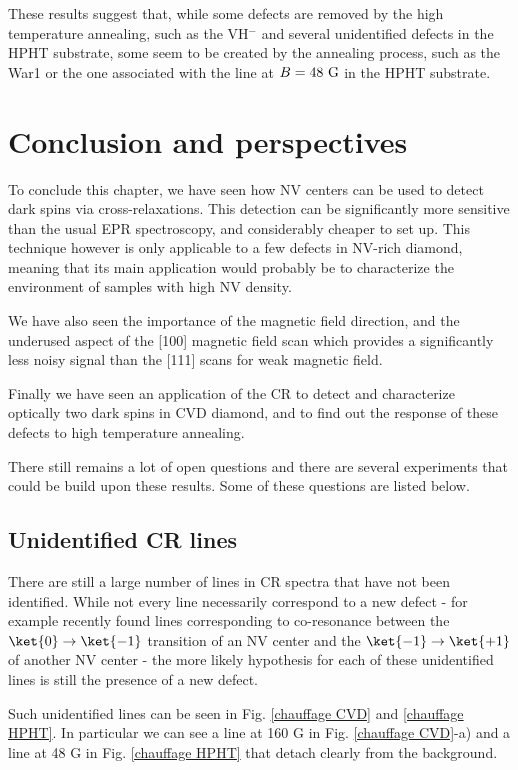 \documentclass[a4paper, 11pt]{book}
\begin{document}
These results suggest that, while some defects are removed by the high temperature annealing, such as the VH$^-$ and several unidentified defects in the HPHT substrate, some seem to be created by the annealing process, such as the War1 or the one associated with the line at $B = 48\ \rm G$ in the HPHT substrate.

\section{Conclusion and perspectives}

To conclude this chapter, we have seen how NV centers can be used to detect dark spins via cross-relaxations. This detection can be significantly more sensitive than the usual EPR spectroscopy, and considerably cheaper to set up. This technique however is only applicable to a few defects in NV-rich diamond, meaning that its main application would probably be to characterize the environment of samples with high NV density.

We have also seen the importance of the magnetic field direction, and the underused aspect of the [100] magnetic field scan which provides a significantly less noisy signal than the [111] scans for weak magnetic field.

Finally we have seen an application of the CR to detect and characterize optically two dark spins in CVD diamond, and to find out the response of these defects to high temperature annealing.

There still remains a lot of open questions and there are several experiments that could be build upon these results. Some of these questions are listed below.

\subsection{Unidentified CR lines}

There are still a large number of lines in CR spectra that have not been identified. While not every line necessarily correspond to a new defect - for example \citep{wunderlich2021magnetic} recently found lines corresponding to co-resonance between the $\ket{0} \to \ket{-1}$ transition of an NV center and the $\ket{-1} \to \ket{+1}$ of another NV center - the more likely hypothesis for each of these unidentified lines is still the presence of a new defect.

Such unidentified lines can be seen in Fig. \ref{chauffage CVD} and \ref{chauffage HPHT}. In particular we can see a line at 160 G in Fig. \ref{chauffage CVD}-a) and a line at 48 G in Fig. \ref{chauffage HPHT} that detach clearly from the background. 
\end{document}
